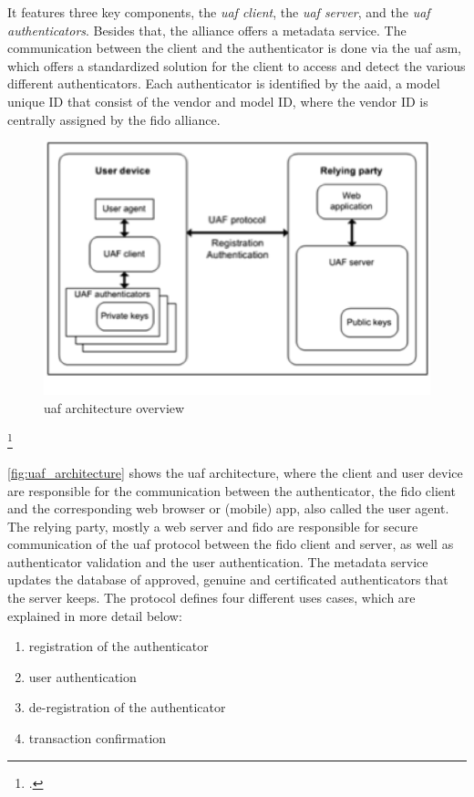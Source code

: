 It features three key components, the \textit{\gls{uaf} client}, the \textit{\gls{uaf} server}, and the \textit{\gls{uaf} authenticators}. Besides that, the alliance offers a metadata service. The communication between the client and the authenticator is done via the \gls{uaf} \gls{asm}, which offers a standardized solution for the client to access and detect the various different authenticators. Each authenticator is identified by the \gls{aaid}, a model unique ID that consist of the vendor and model ID, where the vendor ID is centrally assigned by the \gls{fido} alliance.

\begin{figure}[hbt]
	\centering
	\includegraphics[width=\textwidth]{pics/Picture1}
	\caption[\gls{uaf} architecture overview]{\gls{uaf} architecture overview\footnotemark}
	\label{fig:uaf_architecture}
\end{figure}
\footcitetext[Source: diagram by author, based on][4]{uaf-overview}

\autoref{fig:uaf_architecture} shows the \gls{uaf} architecture, where the client and user device are responsible for the communication between the authenticator, the \gls{fido} client and the corresponding web browser or (mobile) app, also called the user agent. The relying party, mostly a web server and \gls{fido} are responsible for secure communication of the \gls{uaf} protocol between the \gls{fido} client and server, as well as authenticator validation and the user authentication. The metadata service updates the database of approved, genuine and certificated authenticators that the server keeps. The protocol defines four different uses cases, which are explained in more detail below:

\begin{enumerate}
	\item registration of the authenticator
	\item user authentication
	\item de-registration of the authenticator
	\item transaction confirmation
\end{enumerate}

